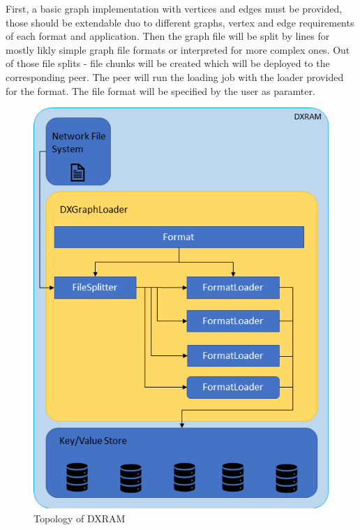 First, a basic graph implementation with vertices and edges must be provided, those should be extendable duo to different graphs, vertex and edge requirements of each format and application.
Then the graph file will be split by lines for mostly likly simple graph file formats or interpreted for more complex ones. Out of those file splits - file chunks will be created which will be deployed to the corresponding peer. The peer will run the loading job with the loader provided for the format. The file format will be specified by the user as paramter.

\begin{figure}[H]
	\centering
	\includegraphics[width=1.0\linewidth]{img/layout.png}
	\caption{Topology of DXRAM}
	\label{topology}
\end{figure}


